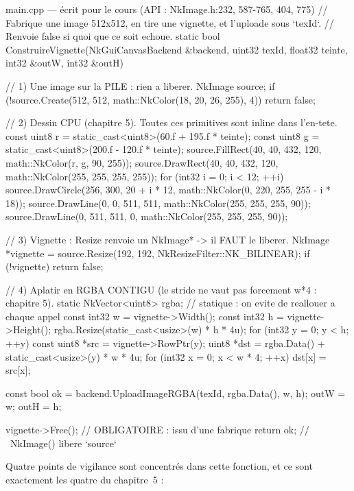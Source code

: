 \begin{nkcode}{main.cpp — écrit pour le cours (API : NkImage.h:232, 587-765, 404, 775)}
// Fabrique une image 512x512, en tire une vignette, et l'uploade sous `texId`.
// Renvoie false si quoi que ce soit echoue.
static bool ConstruireVignette(NkGuiCanvasBackend &backend, uint32 texId, float32 teinte,
                               int32 &outW, int32 &outH) {
    // 1) Une image sur la PILE : rien a liberer.
    NkImage source;
    if (!source.Create(512, 512, math::NkColor(18, 20, 26, 255), 4))
        return false;

    // 2) Dessin CPU (chapitre 5). Toutes ces primitives sont inline dans l'en-tete.
    const uint8 r = static_cast<uint8>(60.f + 195.f * teinte);
    const uint8 g = static_cast<uint8>(200.f - 120.f * teinte);
    source.FillRect(40, 40, 432, 120, math::NkColor(r, g, 90, 255));
    source.DrawRect(40, 40, 432, 120, math::NkColor(255, 255, 255, 255));
    for (int32 i = 0; i < 12; ++i)
        source.DrawCircle(256, 300, 20 + i * 12, math::NkColor(0, 220, 255, 255 - i * 18));
    source.DrawLine(0, 0, 511, 511, math::NkColor(255, 255, 255, 90));
    source.DrawLine(0, 511, 511, 0, math::NkColor(255, 255, 255, 90));

    // 3) Vignette : Resize renvoie un NkImage* -> il FAUT le liberer.
    NkImage *vignette = source.Resize(192, 192, NkResizeFilter::NK_BILINEAR);
    if (!vignette)
        return false;

    // 4) Aplatir en RGBA CONTIGU (le stride ne vaut pas forcement w*4 : chapitre 5).
    static NkVector<uint8> rgba;          // statique : on evite de reallouer a chaque appel
    const int32 w = vignette->Width();
    const int32 h = vignette->Height();
    rgba.Resize(static_cast<usize>(w) * h * 4u);
    for (int32 y = 0; y < h; ++y) {
        const uint8 *src = vignette->RowPtr(y);
        uint8 *dst = rgba.Data() + static_cast<usize>(y) * w * 4u;
        for (int32 x = 0; x < w * 4; ++x)
            dst[x] = src[x];
    }

    const bool ok = backend.UploadImageRGBA(texId, rgba.Data(), w, h);
    outW = w;
    outH = h;

    vignette->Free();                     // OBLIGATOIRE : issu d'une fabrique
    return ok;                            // ~NkImage() libere `source`
}
\end{nkcode}

Quatre points de vigilance sont concentrés dans cette fonction, et ce sont
exactement les quatre du chapitre~5 :

